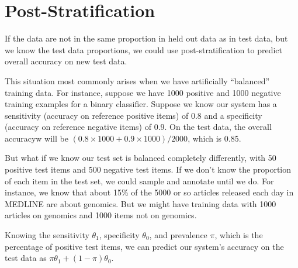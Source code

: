 \section{Post-Stratification}\label{section:classifier-eval-post-stratification}

If the data are not in the same proportion in held out data as in test
data, but we know the test data proportions, we could use
post-stratification to predict overall accuracy on new test data.  

This situation most commonly arises when we have artificially
``balanced'' training data.  For instance, suppose we have 1000
positive and 1000 negative training examples for a binary classifier.
Suppose we know our system has a sensitivity (accuracy on reference
positive items) of 0.8 and a specificity (accuracy on reference
negative items) of 0.9.   On the test data, the overall accuracyw
will be $(0.8 \times 1000 + 0.9 \times 1000)/2000$, which is 0.85.

But what if we know our test set is balanced completely differently,
with 50 positive test items and 500 negative test items.  If we don't
know the proportion of each item in the test set, we could sample and
annotate until we do.  For instance, we know that about 15\% of the
5000 or so articles released each day in MEDLINE are about genomics.
But we might have training data with 1000 articles on genomics
and 1000 items not on genomics.  

Knowing the sensitivity $\theta_1$, specificity $\theta_0$, and
prevalence $\pi$, which is the percentage of positive test items,
we can predict our system's accuracy on the test data as
$\pi \theta_1 + (1-\pi)\theta_0$.








